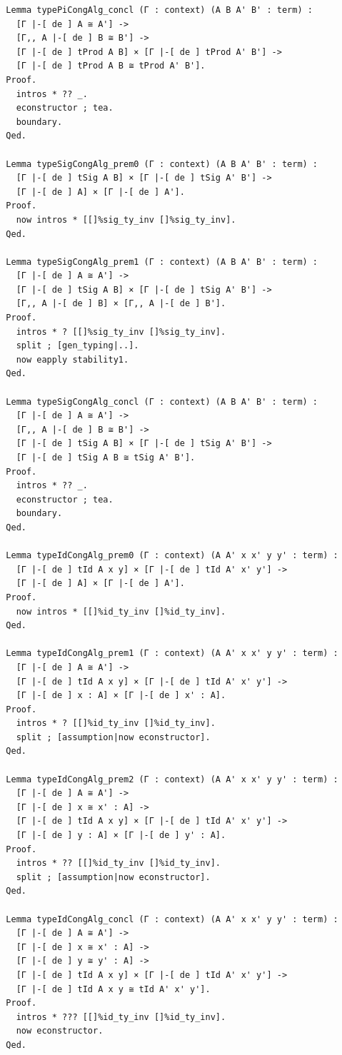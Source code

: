 \documentclass[10pt,a4paper]{amsart}
\begin{document}
\begin{lstlisting}
  Lemma typePiCongAlg_concl (Γ : context) (A B A' B' : term) :
    [Γ |-[ de ] A ≅ A'] ->
    [Γ,, A |-[ de ] B ≅ B'] ->
    [Γ |-[ de ] tProd A B] × [Γ |-[ de ] tProd A' B'] ->
    [Γ |-[ de ] tProd A B ≅ tProd A' B'].
  Proof.
    intros * ?? _.
    econstructor ; tea.
    boundary.
  Qed.

  Lemma typeSigCongAlg_prem0 (Γ : context) (A B A' B' : term) :
    [Γ |-[ de ] tSig A B] × [Γ |-[ de ] tSig A' B'] ->
    [Γ |-[ de ] A] × [Γ |-[ de ] A'].
  Proof.
    now intros * [[]%sig_ty_inv []%sig_ty_inv].
  Qed.

  Lemma typeSigCongAlg_prem1 (Γ : context) (A B A' B' : term) :
    [Γ |-[ de ] A ≅ A'] ->
    [Γ |-[ de ] tSig A B] × [Γ |-[ de ] tSig A' B'] ->
    [Γ,, A |-[ de ] B] × [Γ,, A |-[ de ] B'].
  Proof.
    intros * ? [[]%sig_ty_inv []%sig_ty_inv].
    split ; [gen_typing|..].
    now eapply stability1.
  Qed.
  
  Lemma typeSigCongAlg_concl (Γ : context) (A B A' B' : term) :
    [Γ |-[ de ] A ≅ A'] ->
    [Γ,, A |-[ de ] B ≅ B'] ->
    [Γ |-[ de ] tSig A B] × [Γ |-[ de ] tSig A' B'] ->
    [Γ |-[ de ] tSig A B ≅ tSig A' B'].
  Proof.
    intros * ?? _.
    econstructor ; tea.
    boundary.
  Qed.

  Lemma typeIdCongAlg_prem0 (Γ : context) (A A' x x' y y' : term) :
    [Γ |-[ de ] tId A x y] × [Γ |-[ de ] tId A' x' y'] ->
    [Γ |-[ de ] A] × [Γ |-[ de ] A'].
  Proof.
    now intros * [[]%id_ty_inv []%id_ty_inv].
  Qed.
  
  Lemma typeIdCongAlg_prem1 (Γ : context) (A A' x x' y y' : term) :
    [Γ |-[ de ] A ≅ A'] ->
    [Γ |-[ de ] tId A x y] × [Γ |-[ de ] tId A' x' y'] ->
    [Γ |-[ de ] x : A] × [Γ |-[ de ] x' : A].
  Proof.
    intros * ? [[]%id_ty_inv []%id_ty_inv].
    split ; [assumption|now econstructor].
  Qed.

  Lemma typeIdCongAlg_prem2 (Γ : context) (A A' x x' y y' : term) :
    [Γ |-[ de ] A ≅ A'] ->
    [Γ |-[ de ] x ≅ x' : A] ->
    [Γ |-[ de ] tId A x y] × [Γ |-[ de ] tId A' x' y'] ->
    [Γ |-[ de ] y : A] × [Γ |-[ de ] y' : A].
  Proof.
    intros * ?? [[]%id_ty_inv []%id_ty_inv].
    split ; [assumption|now econstructor].
  Qed.

  Lemma typeIdCongAlg_concl (Γ : context) (A A' x x' y y' : term) :
    [Γ |-[ de ] A ≅ A'] ->
    [Γ |-[ de ] x ≅ x' : A] ->
    [Γ |-[ de ] y ≅ y' : A] ->
    [Γ |-[ de ] tId A x y] × [Γ |-[ de ] tId A' x' y'] ->
    [Γ |-[ de ] tId A x y ≅ tId A' x' y'].
  Proof.
    intros * ??? [[]%id_ty_inv []%id_ty_inv].
    now econstructor.
  Qed.



\end{lstlisting}
\end{document}
